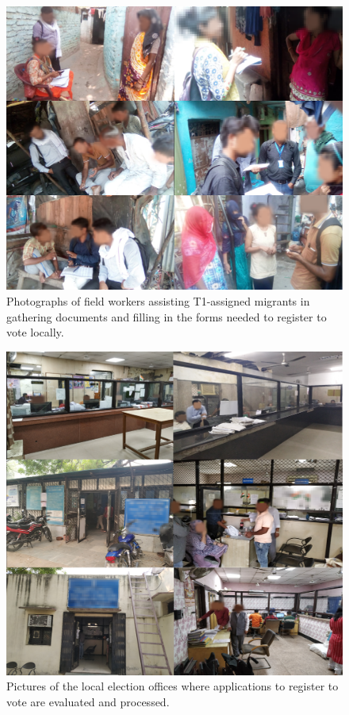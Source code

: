 \documentclass[
  11.5pt,
]{article}
\begin{document}
\begin{figure}
\includegraphics[width=1\linewidth]{pic-fieldteam} \caption{Photographs of field workers assisting T1-assigned migrants in gathering documents and filling in the forms needed to register to vote locally.}\label{fig:unnamed-chunk-29}
\end{figure}

\begin{figure}
\includegraphics[width=1\linewidth]{pic-offices} \caption{Pictures of the local election offices where applications to register to vote are evaluated and processed.}\label{fig:unnamed-chunk-30}
\end{figure}
\end{document}
